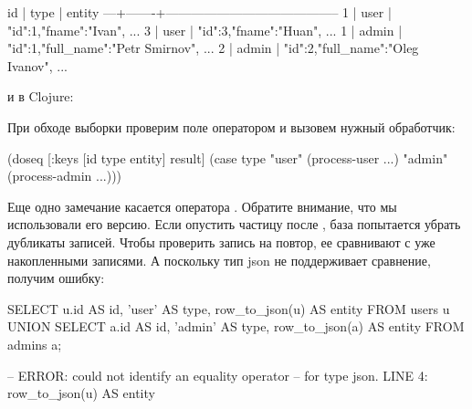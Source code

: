 \begin{english}
  \begin{text}
id | type  |                 entity
---+-------+-----------------------------------------
 1 | user  | {"id":1,"fname":"Ivan", ...}
 3 | user  | {"id":3,"fname":"Huan", ...}
 1 | admin | {"id":1,"full_name":"Petr Smirnov", ...}
 2 | admin | {"id":2,"full_name":"Oleg Ivanov", ...}
  \end{text}
\end{english}

\noindent
и в Clojure:

\begin{english}
  \begin{clojure}
  \end{clojure}
\end{english}

При обходе выборки проверим поле  оператором  и вызовем нужный обработчик:

\begin{english}
  \begin{clojure}
(doseq [{:keys [id type entity]} result]
  (case type
    "user" (process-user ...)
    "admin" (process-admin ...)))
  \end{clojure}
\end{english}

Еще одно замечание касается оператора . Обратите внимание, что мы использовали его  версию. Если опустить частицу  после , база попытается убрать дубликаты записей. Чтобы проверить запись на повтор, ее сравнивают с уже накопленными записями. А поскольку тип json не поддерживает сравнение, получим ошибку:

\begin{english}
  \begin{sql}
SELECT
  u.id AS id,
  'user' AS type,
  row_to_json(u) AS entity
FROM
  users u
UNION
SELECT
  a.id AS id,
  'admin' AS type,
  row_to_json(a) AS entity
FROM
  admins a;

-- ERROR: could not identify an equality operator
-- for type json. LINE 4: row_to_json(u) AS entity
  \end{sql}
\end{english}

